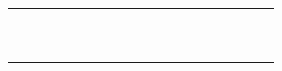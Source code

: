 \documentclass[11pt,landscape]{article}
\begin{document}
\begin{table}[]
{\begin{tabular}{lllllllllllllllllll}
     &
       &
       &
       &
       &
       &
       &
       &
       &
       &
       &
       &
       &
       &
       &
       &
       &
       &
       \\
     &
       &
       &
       &
       &
       &
       &
       &
       &
       &
       &
       &
       &
       &
       &
       &
       &
       &
       \\
     &
       &
       &
       &
       &
       &
       &
       &
       &
       &
       &
       &
       &
       &
       &
       &
       &
       &
       \\
     &
       &
       &
       &
       &
       &
       &
       &
       &
       &
       &
       &
       &
       &
       &
       &
       &
       &
       \\
     &
       &
       &
       &
       &
       &
       &
       &
       &
       &
       &
       &
       &
       &
       &
       &
       &
       &
       \\
     &
       &
       &
       &
       &
       &
       &
       &
       &
       &
       &
       &
       &
       &
       &
       &
       &
       &
       \\
     &
       &
       &
       &
       &
       &
       &
       &
       &
       &
       &
       &
       &
       &
       &
       &
       &
       &
       \\
     &
       &
       &
       &
       &
       &
       &
       &
       &
       &
       &
       &
       &
       &
       &
       &
       &
       &
       \\
     &
       &
       &
       &
       &
       &
       &
       &
       &
       &
       &
       &
       &
       &
       &
       &
       &
       &
       \\
     &
       &
       &
       &
       &
       &
       &
       &
       &
       &
       &
       &
       &
       &
       &
       &
       &
       &
      
    \end{tabular}%
    }
    \label{tab:guillermo_t3}
\end{table}
    

\newpage
\nocite{*}


\end{document}
